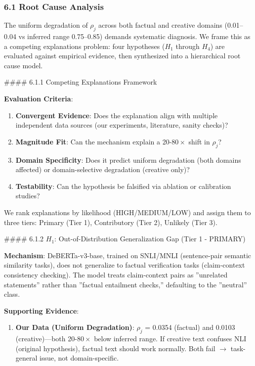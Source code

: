 
\subsubsection{6.1 Root Cause Analysis}

The uniform degradation of $\rho_j$ across both factual and creative domains (0.01--0.04 vs inferred range 0.75--0.85) demands systematic diagnosis. We frame this as a competing explanations problem: four hypotheses ($H_1$ through $H_4$) are evaluated against empirical evidence, then synthesized into a hierarchical root cause model.

\#\#\#\# 6.1.1 Competing Explanations Framework

\textbf{Evaluation Criteria}:
\begin{enumerate}
\item \textbf{Convergent Evidence}: Does the explanation align with multiple independent data sources (our experiments, literature, sanity checks)?
\item \textbf{Magnitude Fit}: Can the mechanism explain a 20-$80\times$ shift in $\rho_j$?
\item \textbf{Domain Specificity}: Does it predict uniform degradation (both domains affected) or domain-selective degradation (creative only)?
\item \textbf{Testability}: Can the hypothesis be falsified via ablation or calibration studies?
\end{enumerate}

We rank explanations by likelihood (HIGH/MEDIUM/LOW) and assign them to three tiers: Primary (Tier 1), Contributory (Tier 2), Unlikely (Tier 3).

\#\#\#\# 6.1.2 $H_1$: Out-of-Distribution Generalization Gap (Tier 1 - PRIMARY)

\textbf{Mechanism}: DeBERTa-v3-base, trained on SNLI/MNLI (sentence-pair semantic similarity tasks), does not generalize to factual verification tasks (claim-context consistency checking). The model treats claim-context pairs as ''unrelated statements'' rather than ''factual entailment checks,'' defaulting to the ''neutral'' class.

\textbf{Supporting Evidence}:

\begin{enumerate}
\item \textbf{Our Data (Uniform Degradation)}: $\rho_j$ = 0.0354 (factual) and 0.0103 (creative)---both 20-$80\times$ below inferred range. If creative text confuses NLI (original hypothesis), factual text should work normally. Both fail $\rightarrow$ task-general issue, not domain-specific.
\end{enumerate}

